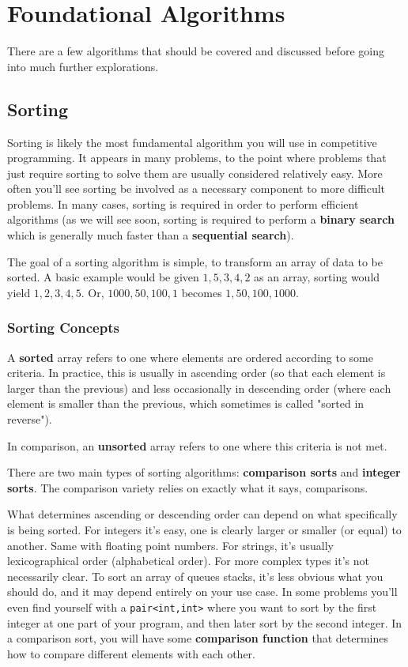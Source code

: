 \section{Foundational Algorithms}

There are a few algorithms that should be covered and discussed before going into much further explorations.

\subsection{Sorting}

Sorting is likely the most fundamental algorithm you will use in competitive programming. It appears in many problems, to the point where problems that just require sorting to solve them are usually considered relatively easy. More often you'll see sorting be involved as a necessary component to more difficult problems. In many cases, sorting is required in order to perform efficient algorithms (as we will see soon, sorting is required to perform a \textbf{binary search} which is generally much faster than a \textbf{sequential search}).

The goal of a sorting algorithm is simple, to transform an array of data to be sorted. A basic example would be given $1,5,3,4,2$ as an array, sorting would yield $1,2,3,4,5$. Or, $1000,50,100,1$ becomes $1,50,100,1000$.

\subsubsection{Sorting Concepts}

A \textbf{sorted} array refers to one where elements are ordered according to some criteria. In practice, this is usually in ascending order  (so that each element is larger than the previous) and less occasionally in descending order  (where each element is smaller than the previous, which sometimes is called "sorted in reverse").

In comparison, an \textbf{unsorted} array refers to one where this criteria is not met.

There are two main types of sorting algorithms: \textbf{comparison sorts} and \textbf{integer sorts}. The comparison variety relies on exactly what it says, comparisons.

What determines ascending or descending order can depend on what specifically is being sorted. For integers it's easy, one is clearly larger or smaller (or equal) to another. Same with floating point numbers. For strings, it's usually lexicographical order (alphabetical order). For more complex types it's not necessarily clear. To sort an array of queues stacks, it's less obvious what you should do, and it may depend entirely on your use case. In some problems you'll even find yourself with a \texttt{pair<int,int>} where you want to sort by the first integer at one part of your program, and then later sort by the second integer. In a comparison sort, you will have some \textbf{comparison function} that determines how to compare different elements with each other.

